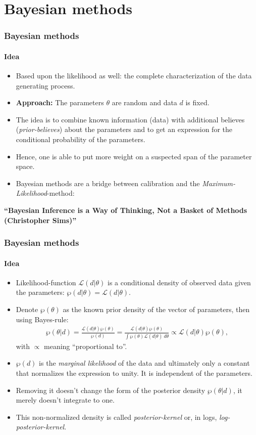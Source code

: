 \documentclass[handout]{beamer}  %
\begin{document}
\section{Bayesian methods}
\begin{frame}\frametitle{Bayesian methods}\framesubtitle{Idea}
	\begin{itemize}
		\item Based upon the likelihood as well: the complete characterization of the data generating process.
		\item \textbf{Approach:} The parameters ${\theta}$ are random and data ${d}$ is fixed.
		\item The idea is to combine known information (data) with additional believes (\emph{prior-believes}) about the parameters and to get an expression for the conditional probability of the parameters.
		\item Hence, one is able to put more weight on a suspected span of the parameter space.
		\item Bayesian methods are a bridge between calibration and the \emph{Maximum-Likelihood}-method:
	\end{itemize}
	\textbf{\enquote{Bayesian Inference is a Way of Thinking, Not a Basket of Methods (Christopher Sims)}}
\end{frame}

\begin{frame}\frametitle{Bayesian methods}\framesubtitle{Idea}
	\begin{itemize}
		\item Likelihood-function $\mathcal{L}({d}|{\theta})$ is a conditional density of observed data given the parameters:
		$\wp({d}|{\theta})=\mathcal{L}({d}|{\theta})$.
		\item Denote $\wp({\theta})$ as the known prior density of the vector of parameters, then using Bayes-rule:
		\begin{align*}
			\wp({\theta}|{d}) = \frac{\mathcal{L}({d}|{\theta})\wp({\theta})}{\wp({d})} =  \frac{\mathcal{L}({d}|{\theta})\wp({\theta})}{\int \wp({\theta}) \mathcal{L}({d|{\theta}}) ~d{\theta}} \propto \mathcal{L}({d}|{\theta})\wp({\theta}),
		\end{align*}
		with $\propto$ meaning \enquote{proportional to}.
		
		\item $\wp({d})$ is the \emph{marginal likelihood} of the data and ultimately only a constant that normalizes the expression to unity. It is independent of the parameters.
		\item Removing it doesn't change the form of the posterior density $\wp({\theta}|{d})$, it merely doesn't integrate to one.
		\item This non-normalized density is called \emph{posterior-kernel} or, in logs, \emph{log-posterior-kernel}.
	\end{itemize}
\end{frame}
\end{document}
